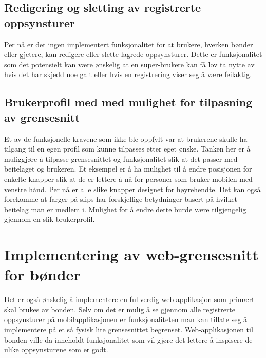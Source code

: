 \subsection{Redigering og sletting av registrerte oppsynsturer}
Per nå er det ingen implementert funksjonalitet for at brukere, hverken bønder eller gjetere, kan redigere eller slette lagrede oppsynsturer. Dette er funksjonalitet som det potensielt kan være ønskelig at en super-brukere kan få lov ta nytte av hvis det har skjedd noe galt eller hvis en registrering viser seg å være feilaktig.

\subsection{Brukerprofil med med mulighet for tilpasning av grensesnitt}
Et av de funksjonelle kravene som ikke ble oppfylt var at brukerene skulle ha tilgang til en egen profil som kunne tilpasses etter eget ønske. Tanken her er å muliggjøre å tilpasse grensesnittet og funksjonalitet slik at det passer med beitelaget og brukeren. Et eksempel er å ha mulighet til å endre posisjonen for enkelte knapper slik at de er lettere å nå for personer som bruker mobilen med venstre hånd. Per nå er alle slike knapper designet for høyrehendte. Det kan også forekomme at farger på slips har forskjellige betydninger basert på hvilket beitelag man er medlem i. Mulighet for å endre dette burde være tilgjengelig gjennom en slik brukerprofil.

\section{Implementering av web-grensesnitt for bønder}
Det er også ønskelig å implementere en fullverdig web-applikasjon som primært skal brukes av bonden. Selv om det er mulig å se gjennom alle registrerte oppsynsturer på mobilapplikasjonen er funksjonaliteten man kan tillate seg å implementere på et så fysisk lite grensesnittet begrenset. Web-applikasjonen til bonden ville da inneholdt funksjonalitet som vil gjøre det lettere å inspisere de ulike oppsynsturene som er godt.